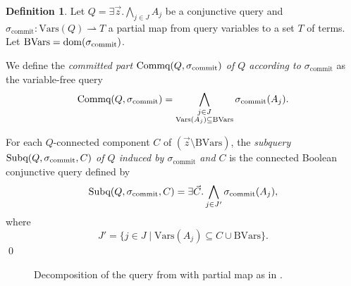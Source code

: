 \documentclass[12pt]{report}
\theoremstyle{plain}
\theoremstyle{definition}
\newtheorem{definition}[theorem]{Definition}
\def\Vars{{\mathrm{Vars}}}
\newcommand{\dom}[1]{\ensuremath{\normalfont{\operatorname{dom}}\!\left( #1 \right)}}
\newcommand{\Subq}[3]{\ensuremath{\normalfont{\textrm{Subq}}\!\left( #1, #2, #3 \right)}}
\newcommand{\Commq}[2]{\ensuremath{\normalfont{\textrm{Commq}}\!\left( #1, #2 \right)}}
\begin{document}
\begin{definition}
\label{definition:query-splitting}
  Let $Q = \exists \vec{z}. \bigwedge_{j \in J} A_j$ be a conjunctive query and $\sigma_{\mathrm{commit}}: \Vars(Q) \rightharpoonup T$ a partial map from query variables to a set $T$ of terms. Let $\mathrm{BVars} = \dom{\sigma_{\mathrm{commit}}}$.

  We define the \emph{committed part $\Commq{Q}{\sigma_{\mathrm{commit}}}$ of $Q$ according to $\sigma_{\mathrm{commit}}$} as the variable-free query
  $$\Commq{Q}{\sigma_{\mathrm{commit}}} = \bigwedge_{\substack{j \in J \\ \Vars(A_j) \subseteq \mathrm{BVars}}} \sigma_{\mathrm{commit}}(A_j).$$

  For each $Q$-connected component $C$ of $(\vec{z} \setminus \mathrm{BVars})$, the \emph{subquery $\Subq{Q}{\sigma_{\mathrm{commit}}}{C}$ of $Q$ induced by $\sigma_{\mathrm{commit}}$ and $C$} is the connected Boolean conjunctive query defined by
  $$\Subq{Q}{\sigma_{\mathrm{commit}}}{C} = \exists \vec{C}. \bigwedge_{j \in J'} \sigma_{\mathrm{commit}}(A_j),$$
  where $$J' = \{ j \in J \mid \Vars(A_j) \subseteq C \cup \mathrm{BVars} \}.$$
  \qed
\end{definition}

\begin{figure}[ht]
  \centering
  
  \caption{Decomposition of the query from  with partial map as in .}
  \label{figure:bcq-decomposition-example}
\end{figure}
\end{document}
